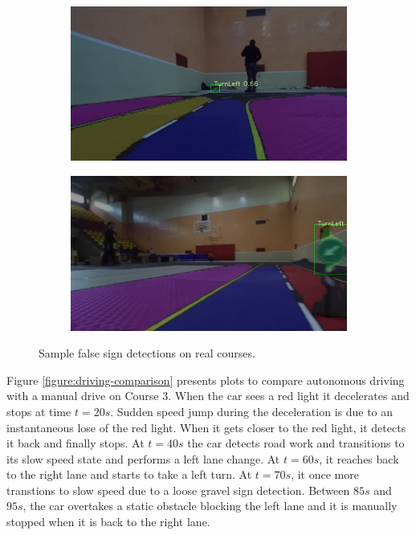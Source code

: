 \begin{figure}[h]
\begin{subfigure}[b]{0.45\linewidth}
  \end{subfigure}
  \begin{subfigure}[b]{0.45\linewidth}
    \includegraphics[width=\linewidth]{figures/experiments/real/fp-turnleft1.jpg}
  \end{subfigure}
  \begin{subfigure}[b]{0.45\linewidth}
    \includegraphics[width=\linewidth]{figures/experiments/real/fp-turnleft2.jpg}
  \end{subfigure}
  \caption[False sign detections on real courses]{Sample false sign
    detections on real courses.}
  \label{figure:real-course-detection-bad}
\end{figure}


Figure \ref{figure:driving-comparison} presents plots to compare autonomous
driving with a manual drive on Course 3. When the car sees a red light it
decelerates and stops at time $t = 20s$. Sudden speed jump during the
deceleration is due to an instantaneous lose of the red light. When it gets
closer to the red light, it detects it back and finally stops. At $t = 40s$ the
car detects road work and transitions to its slow speed state and performs a
left lane change. At $t = 60s$, it reaches back to the right lane and starts to
take a left turn. At $t = 70s$, it once more transtions to slow speed due to a
loose gravel sign detection. Between $85s$ and $95s$, the car overtakes a
static obstacle blocking the left lane and it is manually stopped when it is
back to the right lane.

